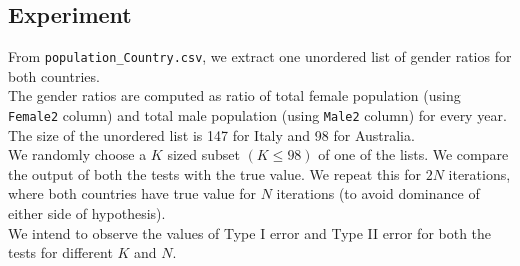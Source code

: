 \documentclass[fleqn, 11pt]{article}
\begin{document}
\subsection{Experiment}
From \verb!population_Country.csv!, we extract one unordered list of gender ratios for both countries. \\
The gender ratios are computed as ratio of total female population (using \verb!Female2! column) and total male population (using \verb!Male2! column) for every year. \\
The size of the unordered list is 147 for Italy and 98 for Australia. \\
We randomly choose a $K$ sized subset $(K \le 98)$ of one of the lists. We compare the output of both the tests with the true value. We repeat this for $2N$ iterations, where both countries have true value for $N$ iterations (to avoid dominance of either side of hypothesis). \\
We intend to observe the values of Type I error and Type II error for both the tests for different $K$ and $N$.
\end{document}

